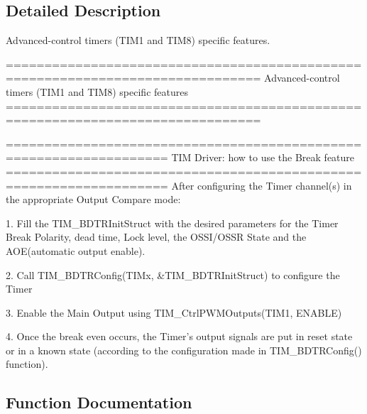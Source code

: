 \subsection{Detailed Description}
Advanced-\/control timers (T\+I\+M1 and T\+I\+M8) specific features. 

\begin{DoxyVerb} ===============================================================================
          Advanced-control timers (TIM1 and TIM8) specific features
 ===============================================================================  
  
       ===================================================================      
              TIM Driver: how to use the Break feature
       =================================================================== 
       After configuring the Timer channel(s) in the appropriate Output Compare mode: 
                         
       1. Fill the TIM_BDTRInitStruct with the desired parameters for the Timer
          Break Polarity, dead time, Lock level, the OSSI/OSSR State and the 
          AOE(automatic output enable).
               
       2. Call TIM_BDTRConfig(TIMx, &TIM_BDTRInitStruct) to configure the Timer
          
       3. Enable the Main Output using TIM_CtrlPWMOutputs(TIM1, ENABLE) 
          
       4. Once the break even occurs, the Timer's output signals are put in reset
          state or in a known state (according to the configuration made in
          TIM_BDTRConfig() function).\end{DoxyVerb}
 

\subsection{Function Documentation}
\mbox{\label{group___t_i_m___group4_ga3df4ba3f0727f63ce621e2b2e6035d4f}} 
